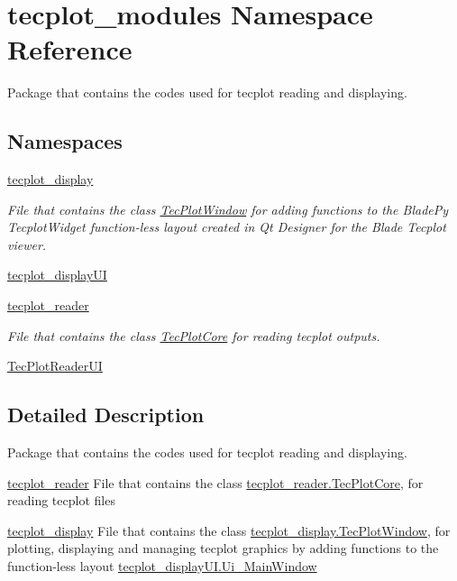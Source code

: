 \hypertarget{a00062}{}\section{tecplot\+\_\+modules Namespace Reference}
\label{a00062}


Package that contains the codes used for tecplot reading and displaying.  


\subsection*{Namespaces}
\begin{DoxyCompactItemize}
\item 
 \hyperlink{a00063}{tecplot\+\_\+display}
\begin{DoxyCompactList}\small\item\em File that contains the class \hyperlink{a00110}{Tec\+Plot\+Window} for adding functions to the Blade\+Py Tecplot\+Widget function-\/less layout created in Qt Designer for the Blade Tecplot viewer. \end{DoxyCompactList}\item 
 \hyperlink{a00064}{tecplot\+\_\+display\+UI}
\item 
 \hyperlink{a00065}{tecplot\+\_\+reader}
\begin{DoxyCompactList}\small\item\em File that contains the class \hyperlink{a00118}{Tec\+Plot\+Core} for reading tecplot outputs. \end{DoxyCompactList}\item 
 \hyperlink{a00066}{Tec\+Plot\+Reader\+UI}
\end{DoxyCompactItemize}


\subsection{Detailed Description}
Package that contains the codes used for tecplot reading and displaying. 

\begin{DoxyItemize}
\item {\ttfamily \hyperlink{a00065}{tecplot\+\_\+reader}} File that contains the class \hyperlink{a00118}{tecplot\+\_\+reader.\+Tec\+Plot\+Core}, for reading tecplot files\end{DoxyItemize}
\begin{DoxyItemize}
\item {\ttfamily \hyperlink{a00063}{tecplot\+\_\+display}} File that contains the class \hyperlink{a00110}{tecplot\+\_\+display.\+Tec\+Plot\+Window}, for plotting, displaying and managing tecplot graphics by adding functions to the function-\/less layout \hyperlink{a00114}{tecplot\+\_\+display\+U\+I.\+Ui\+\_\+\+Main\+Window} \end{DoxyItemize}
